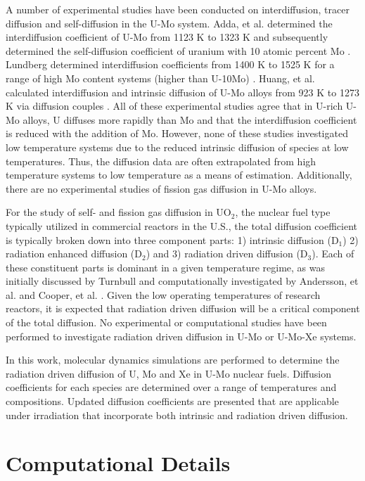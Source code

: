 \documentclass[review]{elsarticle}
\begin{document}
A number of experimental studies have been conducted on interdiffusion, tracer diffusion and self-diffusion in the U-Mo system. Adda, et al. determined the interdiffusion coefficient of U-Mo from 1123 K to 1323 K \cite{adda1958} and subsequently determined the self-diffusion coefficient of uranium with 10 atomic percent Mo \cite{adda1962}.  Lundberg determined interdiffusion coefficients from 1400 K to 1525 K for a range of high Mo content systems (higher than U-10Mo) \cite{lundberg1989}. Huang, et al. calculated interdiffusion and intrinsic diffusion of U-Mo alloys from 923 K to 1273 K via diffusion couples \cite{huang2013}. All of these experimental studies agree that in U-rich U-Mo alloys, U diffuses more rapidly than Mo and that the interdiffusion coefficient is reduced with the addition of Mo. However, none of these studies investigated low temperature systems due to the reduced intrinsic diffusion of species at low temperatures. Thus, the diffusion data are often extrapolated from high temperature systems to low temperature as a means of estimation. Additionally, there are no experimental studies of fission gas diffusion in U-Mo alloys. 

For the study of self- and fission gas diffusion in UO$_2$, the nuclear fuel type typically utilized in commercial reactors in the U.S., the total diffusion coefficient is typically broken down into three component parts: 1) intrinsic diffusion (D$_1$) 2) radiation enhanced diffusion (D$_2$) and 3) radiation driven diffusion (D$_3$). Each of these constituent parts is dominant in a given temperature regime, as was initially discussed by Turnbull \cite{turnbull1982} and computationally investigated by Andersson, et al. \cite{andersson2014} and Cooper, et al. \cite{cooper2016}. Given the low operating temperatures of research reactors, it is expected that radiation driven diffusion will be a critical component of the total diffusion. No experimental or computational studies have been performed to investigate radiation driven diffusion in U-Mo or U-Mo-Xe systems.

In this work, molecular dynamics simulations are performed to determine the radiation driven diffusion of U, Mo and Xe in U-Mo nuclear fuels. Diffusion coefficients for each species are determined over a range of temperatures and compositions. Updated diffusion coefficients are presented that are applicable under irradiation that incorporate both intrinsic and radiation driven diffusion. 

\section{Computational Details}
\end{document}

